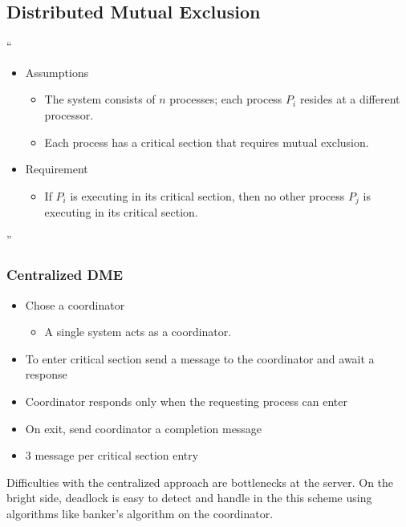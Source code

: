 \documentclass[11pt]{article}
\begin{document}
\subsection {Distributed Mutual Exclusion}
``
\begin{itemize}
\item Assumptions
\begin{itemize}
\item The system consists of $n$ processes; each process $P_i$ resides at a different processor.
\item Each process has a critical section that requires mutual exclusion.
\end{itemize}
\item Requirement 
\begin{itemize}
\item If $P_i$ is executing in its critical section, then no other process $P_j$ is executing in its critical section.
\end{itemize}

\end{itemize}
''

\subsubsection{Centralized DME}
\begin{itemize}
\item Chose a coordinator 
\begin{itemize}
\item A single system acts as a coordinator.
\end{itemize}
\item To enter critical section send a message to the coordinator and await a response
\item Coordinator responds only when the requesting process can enter 
\item On exit, send coordinator a completion message 
\item 3 message per critical section entry
\end{itemize}

Difficulties with the centralized approach are bottlenecks at the server.  On the bright side, deadlock is easy to detect and handle in the this scheme using algorithms like banker's algorithm on the coordinator.  
\end{document}
